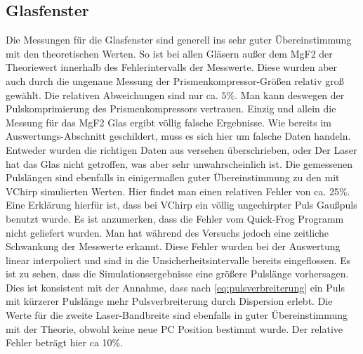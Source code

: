\documentclass[twoside,        %
               BCOR12mm,       %
               english,ngerman, %
               fleqn,headsepline=false,footsepline=false
              ]{Vorlage/MFPREPORT}
\begin{document}
\subsection{Glasfenster}
Die Messungen für die Glasfenster sind generell ins sehr guter Übereinstimmung
mit den theoretischen Werten. So ist bei allen Gläsern außer dem MgF2 der
Theoriewert innerhalb des Fehlerintervalls der Messwerte. Diese wurden aber
auch durch die ungenaue Messung der Prismenkompressor-Größen relativ groß
gewählt. Die relativen
Abweichungen sind nur ca. $5\%$. Man kann deswegen der Pulskomprimierung des
Prismenkompressors vertrauen. Einzig und allein die Messung für das MgF2 Glas
ergibt völlig falsche Ergebnisse. Wie bereits im Auswertungs-Abschnitt
geschildert, muss es sich hier um falsche Daten handeln. Entweder wurden die
richtigen Daten aus versehen überschrieben, oder Der Laser hat das Glas nicht
getroffen, was aber sehr unwahrscheinlich ist. Die gemessenen Pulslängen sind
ebenfalls in einigermaßen guter Übereinstimmung zu den mit VChirp simulierten
Werten. Hier findet man einen relativen Fehler von ca. 25\%. Eine Erklärung
hierfür ist, dass bei VChirp ein völlig ungechirpter Puls Gaußpuls benutzt
wurde. Es ist anzumerken, dass die Fehler vom Quick-Frog Programm nicht
geliefert wurden. Man hat während des Versuchs jedoch eine zeitliche Schwankung
der Messwerte erkannt. Diese Fehler wurden bei der Auswertung linear
interpoliert und sind in die Unsicherheitsintervalle bereits eingeflossen. Es ist zu sehen, dass die Simulationsergebnisse eine größere Pulslänge
vorhersagen. Dies ist konsistent mit der Annahme, dass nach
\cref{eq:pulsverbreiterung} ein Puls mit kürzerer Pulslänge mehr
Pulsverbreiterung durch Dispersion erlebt.
Die Werte für die zweite Laser-Bandbreite sind ebenfalls in guter
Übereinstimmung mit der Theorie, obwohl keine neue PC Position bestimmt wurde.
Der relative Fehler beträgt hier ca 10\%. 
\end{document}

